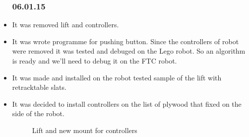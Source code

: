 \begin{itemize}
	\subsubsection{06.01.15}
		\item It was removed lift and controllers.
		
		\item It was wrote programme for pushing button. Since the controllers of robot were removed it was tested and debuged on the Lego robot. So an algorithm is ready and we'll need to debug it on the FTC robot.
		
		\item It was made and installed on the robot tested sample of the lift with retracktable slats.
		
		\item It was decided to install controllers on the list of plywood that fixed on the side of the robot.
			
		\begin{figure}[H]
			\begin{minipage}[h]{1\linewidth}
				\caption{Lift and new mount for controllers}
			\end{minipage}
		\end{figure}	

\end{itemize}
